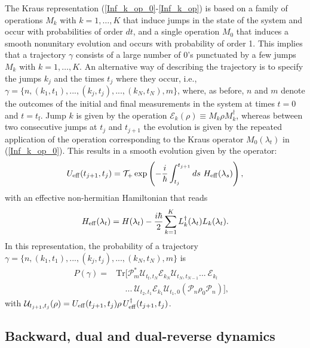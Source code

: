 \documentclass[aps,prx,twocolumn,showpacs,floatfix,superscriptaddress,graphics,longbibliography]{revtex4-1}
\newcommand{\tr}{\mathrm{Tr}}
\newcommand{\E}{{\mathcal E}}
\newcommand{\HAT}{}
\begin{document}
The Kraus representation (\ref{Inf_k_op_0}-\ref{Inf_k_op}) is based on a family of operations $M_k$ with $k=1,\dots,K$ that induce jumps in the state of the system and occur with probabilities of 
order $dt$, and a single  operation $M_0$ that induces a smooth nonunitary evolution and occurs with probability of order 1. This implies that a trajectory $\gamma$ 
consists of a large number of 0's punctuated by a few jumps $M_k$ with $k=1,\dots,K$. An alternative way of describing the trajectory is to specify the jumps $k_j$ and the times $t_j$ 
where they occur, i.e.,  $\gamma = \{ n, (k_1,t_1), ..., (k_j,t_j), ..., (k_N, t_N), m\}$, where, as before, $n$ and $m$ denote the outcomes of the initial and final measurements 
in the system at times $t=0$ and $t = t_\mathrm{f}$. Jump $k$ is given by the operation $\E_k(\rho)\equiv\HAT{M}_k \rho \HAT{M}_k^\dagger$, whereas between two consecutive jumps at $t_j$ and $t_{j+1}$ the evolution is given by the repeated 
application of the operation corresponding to the Kraus operator $M_0(\lambda_t)$ in (\ref{Inf_k_op_0}). This results in a smooth evolution given by the operator:
\begin{equation} \label{ueff}
{U}_{\rm eff} (t_{j+1} ,t_j) = \mathcal{T}_{+} \exp \left( -\frac{i}{\hbar} \int_{t_j}^{t_{j+1}} ds ~ H_{\rm eff} ({\lambda}_{s})  \right), 
\end{equation}
with an effective non-hermitian Hamiltonian that reads
\begin{equation}
 H_{\rm eff}(\lambda_t) = H(\lambda_t)- \frac{i \hbar}{2} \sum_{k=1}^K L_k^\dagger(\lambda_t) L_k(\lambda_t). 
\end{equation} 
In this representation, the probability of a trajectory $\gamma = \{ n, (k_1,t_1), ..., (k_j,t_j), ..., (k_N, t_N), m\}$ is
\begin{align}\label{Pfor}
 P(\gamma) = & \tr[\mathcal{P}_m^\ast \mathcal{U}_{t_\mathrm{f}, t_N} \E_{k_N} \mathcal{U}_{t_N, t_{N-1}} ... ~\E_{k_l}~ \nonumber \\
& ~~~~~ ... ~\mathcal{U}_{t_2, t_1} \E_{k_1} \mathcal{U}_{t_1, 0} (\mathcal{P}_n \rho_0 \mathcal{P}_n)], ~~~~
\end{align}
with $ \mathcal{U}_{t_{j+1}, t_{j}}(\rho)={U}_{\rm eff} (t_{j+1} ,t_j)\rho\,{U}^\dagger_{\rm eff} (t_{j+1} ,t_j)$.

\subsection{Backward, dual and dual-reverse dynamics}
\end{document}
